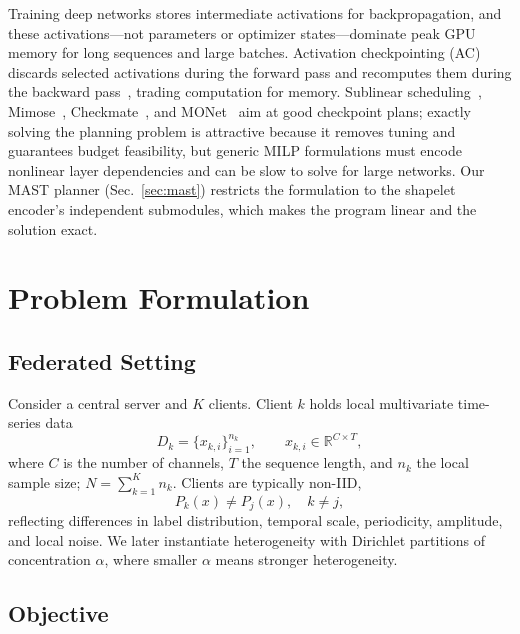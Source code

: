 \documentclass[sigconf]{acmart}
\begin{document}
Training deep networks stores intermediate activations for backpropagation, and
these activations---not parameters or optimizer states---dominate peak GPU memory
for long sequences and large batches. Activation checkpointing (AC) discards
selected activations during the forward pass and recomputes them during the
backward pass~\cite{chen2016checkpoint}, trading computation for memory. Sublinear
scheduling~\cite{chen2016checkpoint}, Mimose~\cite{mimose},
Checkmate~\cite{checkmate}, and MONet~\cite{monet} aim at good checkpoint plans; exactly solving the planning
problem is attractive because it removes tuning and guarantees budget
feasibility, but generic MILP formulations must encode nonlinear layer
dependencies and can be slow to solve for large networks. Our MAST planner
(Sec.~\ref{sec:mast}) restricts the formulation to the shapelet encoder's
independent submodules, which makes the program linear and the solution exact.

\section{Problem Formulation}

\subsection{Federated Setting}

Consider a central server and $K$ clients. Client $k$ holds local multivariate
time-series data
\begin{equation}
D_k = \{x_{k,i}\}_{i=1}^{n_k}, \qquad x_{k,i}\in\mathbb{R}^{C\times T},
\end{equation}
where $C$ is the number of channels, $T$ the sequence length, and $n_k$ the local
sample size; $N=\sum_{k=1}^{K} n_k$. Clients are typically non-IID,
\begin{equation}
P_k(x)\neq P_j(x),\quad k\neq j,
\end{equation}
reflecting differences in label distribution, temporal scale, periodicity,
amplitude, and local noise. We later instantiate heterogeneity with Dirichlet
partitions of concentration $\alpha$, where smaller $\alpha$ means stronger
heterogeneity.

\subsection{Objective}
\end{document}
